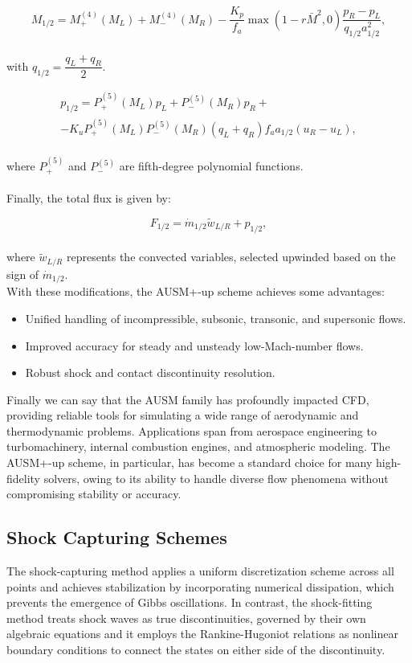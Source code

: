\documentclass[a5paper]{sapthesis}
\begin{document}
	\begin{equation}
		M_{1/2} = M_+^{(4)}(M_L) + M_-^{(4)}(M_R) - \dfrac{K_p}{f_a} \max(1 - r \bar{M}^2, 0) \dfrac{p_R - p_L}{q_{1/2} a_{1/2}^2},
	\end{equation}
	\\
	with $q_{1/2} = \dfrac{q_L + q_R}{2}$.
	
	\begin{equation}
		\begin{aligned}
			p_{1/2} = P_+^{(5)}(M_L)p_L + P_-^{(5)}(M_R)p_R +\\
			- K_u P_+^{(5)}(M_L) P_-^{(5)}(M_R)(q_L + q_R) f_a a_{1/2} (u_R - u_L),
		\end{aligned}
		\label{pressureflux}
	\end{equation}
	\\
	where $P_+^{(5)}$ and $P_-^{(5)}$ are fifth-degree polynomial functions. \\
	\\
	Finally, the total flux is given by:
	
	\begin{equation}
		F_{1/2} = \dot{m}_{1/2} \tilde{w}_{L/R} + p_{1/2},
	\end{equation}
	\\
	where $\tilde{w}_{L/R}$ represents the convected variables, selected upwinded based on the sign of $\dot{m}_{1/2}$. \\
	
	\noindent With these modifications, the AUSM+-up scheme achieves some advantages:
	\begin{itemize}
		\item Unified handling of incompressible, subsonic, transonic, and supersonic flows.
		\item Improved accuracy for steady and unsteady low-Mach-number flows.
		\item Robust shock and contact discontinuity resolution.
	\end{itemize}
	
	\noindent Finally we can say that the AUSM family has profoundly impacted CFD, providing reliable tools for simulating a wide range of aerodynamic and thermodynamic problems. Applications span from aerospace engineering to turbomachinery, internal combustion engines, and atmospheric modeling. The AUSM+-up scheme, in particular, has become a standard choice for many high-fidelity solvers, owing to its ability to handle diverse flow phenomena without compromising stability or accuracy.
	
	\subsection{Shock Capturing Schemes}
	The shock-capturing method applies a uniform discretization scheme across all points and achieves stabilization by incorporating numerical dissipation, which prevents the emergence of Gibbs oscillations. In contrast, the shock-fitting method treats shock waves as true discontinuities, governed by their own algebraic equations and it employs the Rankine-Hugoniot relations as nonlinear boundary conditions to connect the states on either side of the discontinuity.
		
\end{document}
